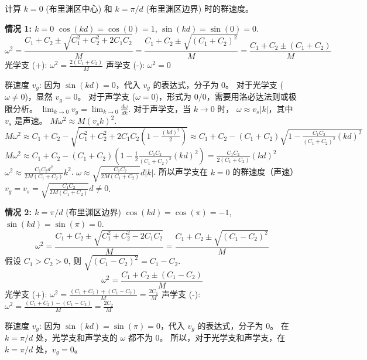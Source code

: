 \documentclass{ctexart}
\begin{document}
计算 $k=0$ (布里渊区中心) 和 $k=\pi/d$ (布里渊区边界) 时的群速度。

\textbf{情况 1: $k=0$}
$\cos(kd) = \cos(0) = 1$, $\sin(kd) = \sin(0) = 0$.
\[ \omega^2 = \frac{C_1 + C_2 \pm \sqrt{C_1^2 + C_2^2 + 2C_1 C_2}}{M} = \frac{C_1 + C_2 \pm \sqrt{(C_1+C_2)^2}}{M} = \frac{C_1 + C_2 \pm (C_1+C_2)}{M} \]
光学支 (+): $\omega^2 = \frac{2(C_1+C_2)}{M}$
声学支 (-): $\omega^2 = 0$

群速度 $v_g$:
因为 $\sin(kd) = 0$，代入 $v_g$ 的表达式，分子为 0。
对于光学支 ($\omega \neq 0$)，显然 $v_g = 0$。
对于声学支 ($\omega = 0$)，形式为 $0/0$，需要用洛必达法则或极限分析。
$\lim_{k\to 0} v_g = \lim_{k\to 0} \frac{d\omega}{dk}$.
对于声学支，当 $k \to 0$ 时， $\omega \approx v_s |k|$，其中 $v_s$ 是声速。
$M\omega^2 \approx M(v_s k)^2$.
$M\omega^2 \approx C_1+C_2 - \sqrt{C_1^2+C_2^2+2C_1C_2(1-\frac{(kd)^2}{2})} \approx C_1+C_2 - (C_1+C_2)\sqrt{1-\frac{C_1C_2}{(C_1+C_2)^2}(kd)^2}$
$M\omega^2 \approx C_1+C_2 - (C_1+C_2)(1-\frac{1}{2}\frac{C_1C_2}{(C_1+C_2)^2}(kd)^2) = \frac{C_1C_2}{2(C_1+C_2)}(kd)^2$
$\omega^2 \approx \frac{C_1C_2 d^2}{2M(C_1+C_2)} k^2$.
$\omega \approx \sqrt{\frac{C_1C_2}{2M(C_1+C_2)}} d |k|$.
所以声学支在 $k=0$ 的群速度（声速） $v_g = v_s = \sqrt{\frac{C_1C_2}{2M(C_1+C_2)}} d \neq 0$.


\textbf{情况 2: $k=\pi/d$} (布里渊区边界)
$\cos(kd) = \cos(\pi) = -1$, $\sin(kd) = \sin(\pi) = 0$.
\[ \omega^2 = \frac{C_1 + C_2 \pm \sqrt{C_1^2 + C_2^2 - 2C_1 C_2}}{M} = \frac{C_1 + C_2 \pm \sqrt{(C_1-C_2)^2}}{M} \]
假设 $C_1 > C_2 > 0$, 则 $\sqrt{(C_1-C_2)^2} = C_1-C_2$.
\[ \omega^2 = \frac{C_1 + C_2 \pm (C_1-C_2)}{M} \]
光学支 (+): $\omega^2 = \frac{(C_1+C_2)+(C_1-C_2)}{M} = \frac{2C_1}{M}$
声学支 (-): $\omega^2 = \frac{(C_1+C_2)-(C_1-C_2)}{M} = \frac{2C_2}{M}$

群速度 $v_g$:
因为 $\sin(kd) = \sin(\pi) = 0$，代入 $v_g$ 的表达式，分子为 0。
在 $k=\pi/d$ 处，光学支和声学支的 $\omega$ 都不为 0。
所以，对于光学支和声学支，在 $k=\pi/d$ 处，$v_g = 0$。
\end{document}
